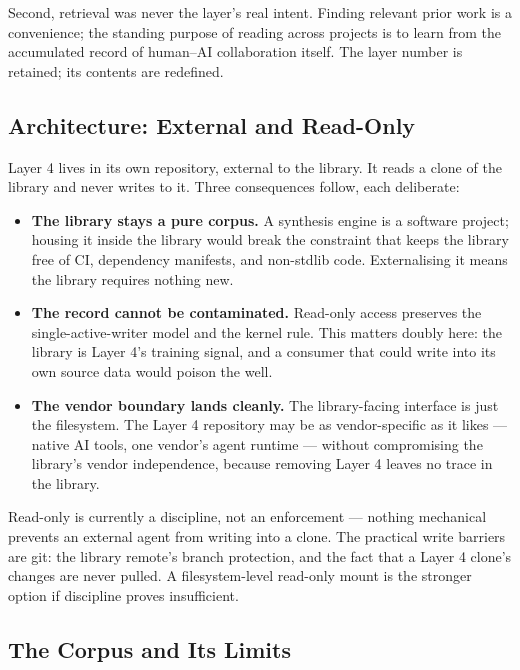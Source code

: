 \documentclass[12pt,letterpaper]{article}
\begin{document}
Second, retrieval was never the layer's real intent. Finding relevant
prior work is a convenience; the standing purpose of reading across
projects is to learn from the accumulated record of human--AI
collaboration itself. The layer number is retained; its contents are
redefined.

\subsection{Architecture: External and Read-Only}

Layer 4 lives in its own repository, external to the library. It reads
a clone of the library and never writes to it. Three consequences
follow, each deliberate:

\begin{itemize}
  \item \textbf{The library stays a pure corpus.} A synthesis engine
        is a software project; housing it inside the library would
        break the constraint that keeps the library free of CI,
        dependency manifests, and non-stdlib code. Externalising it
        means the library requires nothing new.
  \item \textbf{The record cannot be contaminated.} Read-only access
        preserves the single-active-writer model and the kernel rule.
        This matters doubly here: the library is Layer 4's training
        signal, and a consumer that could write into its own source
        data would poison the well.
  \item \textbf{The vendor boundary lands cleanly.} The library-facing
        interface is just the filesystem. The Layer 4 repository may
        be as vendor-specific as it likes --- native AI tools, one
        vendor's agent runtime --- without compromising the library's
        vendor independence, because removing Layer 4 leaves no trace
        in the library.
\end{itemize}

Read-only is currently a discipline, not an enforcement --- nothing
mechanical prevents an external agent from writing into a clone. The
practical write barriers are git: the library remote's branch
protection, and the fact that a Layer 4 clone's changes are never
pulled. A filesystem-level read-only mount is the stronger option if
discipline proves insufficient.

\subsection{The Corpus and Its Limits}
\end{document}
